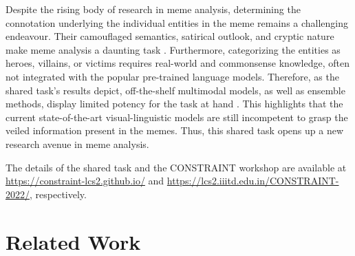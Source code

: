 \documentclass[11pt]{article}
\begin{document}
Despite the rising body of research in meme analysis, determining the connotation underlying the individual entities in the meme remains a challenging endeavour. Their camouflaged semantics, satirical outlook, and cryptic nature make meme analysis a daunting task \cite{sabat2019hate}. Furthermore, categorizing the entities as heroes, villains, or victims requires real-world and commonsense knowledge, often not integrated with the popular pre-trained language models. Therefore, as the shared task's results depict, off-the-shelf multimodal models, as well as ensemble methods, display limited potency for the task at hand \cite{kiela2020hateful}. This highlights that the current state-of-the-art visual-linguistic models are still incompetent to grasp the veiled information present in the memes. Thus, this shared task opens up a new research avenue in meme analysis. 

The details of the shared task and the CONSTRAINT workshop are available at \url{https://constraint-lcs2.github.io/} and \url{https://lcs2.iiitd.edu.in/CONSTRAINT-2022/}, respectively.





\section{Related Work}


\end{document}
